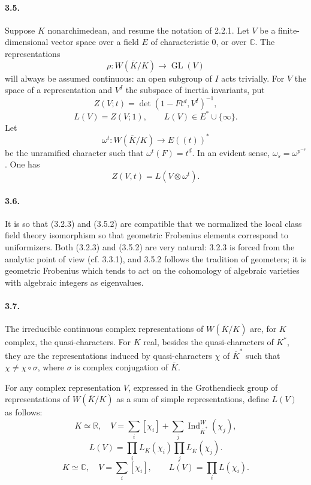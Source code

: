 \documentclass[10pt,letterpaper]{article}
\newcommand{\C}{\mathbb C}
\newcommand{\GL}{\operatorname{GL}}
\newcommand{\Ind}{\operatorname{Ind}}
\providecommand{\R}{\mathbb R}
\providecommand{\GL}{\operatorname{GL}}
\providecommand{\GL}{\operatorname{GL}}
\providecommand{\Ind}{\operatorname{Ind}}
\begin{document}
\paragraph{3.5.} Suppose \(K\) nonarchimedean, and resume the notation of 2.2.1. Let \(V\) be a finite-dimensional vector space over a field \(E\) of characteristic \(0\), or over \(\C\). The representations
\[
\rho:W(\overline K/K)\longrightarrow\GL(V)
\]
will always be assumed continuous: an open subgroup of \(I\) acts trivially. For \(V\) the space of a representation and \(V^I\) the subspace of inertia invariants, put
\[
\tag{3.5.1}
Z(V;t)=\det(1-Ft^d,V^I)^{-1},
\]
\[
\tag{3.5.2}
L(V)=Z(V;1),\qquad L(V)\in E^*\cup\{\infty\}.
\]
Let
\[
\omega^t:W(\overline K/K)\longrightarrow E((t))^*
\]
be the unramified character such that \(\omega^t(F)=t^d\). In an evident sense, \(\omega_s=\omega^{p^{-s}}\). One has
\[
\tag{3.5.3}
Z(V,t)=L(V\otimes\omega^t).
\]

\paragraph{3.6.} It is so that (3.2.3) and (3.5.2) are compatible that we normalized the local class field theory isomorphism so that geometric Frobenius elements correspond to uniformizers. Both (3.2.3) and (3.5.2) are very natural: 3.2.3 is forced from the analytic point of view (cf. 3.3.1), and 3.5.2 follows the tradition of geometers; it is geometric Frobenius which tends to act on the cohomology of algebraic varieties with algebraic integers as eigenvalues.

\paragraph{3.7.} The irreducible continuous complex representations of \(W(\overline K/K)\) are, for \(K\) complex, the quasi-characters. For \(K\) real, besides the quasi-characters of \(K^*\), they are the representations induced by quasi-characters \(\chi\) of \(\overline K^*\) such that \(\chi\ne\chi\circ\sigma\), where \(\sigma\) is complex conjugation of \(\overline K\).

For any complex representation \(V\), expressed in the Grothendieck group of representations of \(W(\overline K/K)\) as a sum of simple representations, define \(L(V)\) as follows:
\[
\tag{3.7.1}
K\simeq\R,\quad
V=\sum_i[\chi_i]+\sum_j\Ind_{\overline K^*}^{W}(\chi_j),
\]
\[
L(V)=\prod_i L_K(\chi_i)\prod_j L_{\overline K}(\chi_j).
\]
\[
\tag{3.7.2}
K\simeq\C,\quad V=\sum_i[\chi_i],
\qquad
L(V)=\prod_iL(\chi_i).
\]
\end{document}
